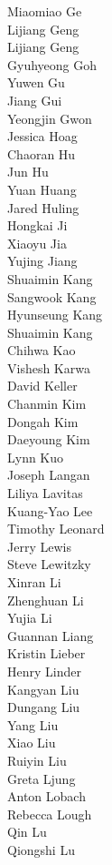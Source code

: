 Miaomiao Ge\\
Lijiang Geng\\
Lijiang Geng\\
Gyuhyeong Goh\\
Yuwen Gu\\
Jiang Gui\\
Yeongjin Gwon\\
Jessica Hoag\\
Chaoran Hu\\
Jun Hu\\
Yuan Huang\\
Jared Huling\\
Hongkai Ji\\
Xiaoyu Jia\\
Yujing Jiang\\
Shuaimin Kang\\
Sangwook Kang\\
Hyunseung Kang\\
Shuaimin Kang\\
Chihwa Kao\\
Vishesh Karwa\\
David Keller\\
Chanmin Kim\\
Dongah Kim\\
Daeyoung Kim\\
Lynn Kuo\\
Joseph Langan\\
Liliya Lavitas\\
Kuang-Yao Lee\\
Timothy Leonard\\
Jerry Lewis\\
Steve Lewitzky\\
Xinran Li\\
Zhenghuan Li\\
Yujia Li\\
Guannan Liang\\
Kristin Lieber\\
Henry Linder\\
Kangyan Liu\\
Dungang Liu\\
Yang Liu\\
Xiao Liu\\
Ruiyin Liu\\
Greta Ljung\\
Anton Lobach\\
Rebecca Lough\\
Qin Lu\\
Qiongshi Lu\\
